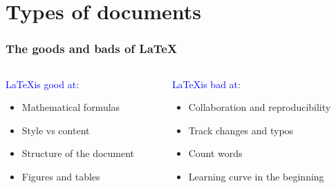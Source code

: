 \documentclass[10pt]{beamer}
\newcommand{\words}{\textcolor{blue}}
\begin{document}
\endgroup

    \section{Types of documents}
      \begin{frame} 
         \frametitle{The goods and bads of \LaTeX}
            
        \begin{columns}
        \begin{column}{0.4\textwidth}
                 
               \begin{center}
                 \words{\LaTeX  is good at}:
               \end{center}  
   
                   
         
      \begin{itemize}
        \item Mathematical formulas
        \item Style vs content
        \item Structure of the document
        \item Figures and tables
      \end{itemize}
      
        \end{column}
       
        
       \begin{column}{0.5\textwidth}
         
        \begin{center}
                 \words{\LaTeX  is bad  at}:
               \end{center}
               
               
                                               
      \begin{itemize}
        \item Collaboration and reproducibility
        \item Track changes and typos
        \item Count words
        \item Learning curve in the beginning
        
   
      \end{itemize}
      
         \end{column}
         
        
     \end{columns}
       
            
        \end{frame}
            
\end{document}
